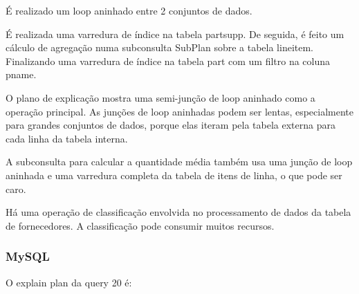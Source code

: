 \documentclass{article}
\begin{document}
  É realizado um loop aninhado entre 2 conjuntos de dados.

  É realizada uma varredura de índice na tabela partsupp. De seguida, é feito um cálculo de agregação numa subconsulta SubPlan sobre a tabela lineitem. Finalizando uma varredura de índice na tabela part com um filtro na coluna p\underline{}name.


O plano de explicação mostra uma semi-junção de loop aninhado como a operação principal. As junções de loop aninhadas podem ser lentas, especialmente para grandes conjuntos de dados, porque elas iteram pela tabela externa para cada linha da tabela interna.

A subconsulta para calcular a quantidade média também usa uma junção de loop aninhada e uma varredura completa da tabela de itens de linha, o que pode ser caro.

Há uma operação de classificação envolvida no processamento de dados da tabela de fornecedores. A classificação pode consumir muitos recursos.

\subsubsection{MySQL}
O explain plan da query 20 é:\\
\end{document}
